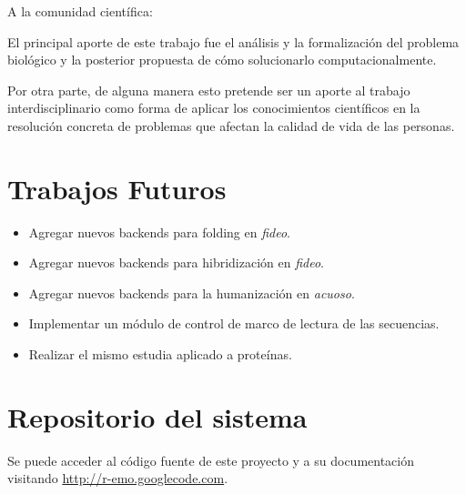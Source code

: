 \par A la comunidad científica:
\par El principal aporte de este trabajo fue el análisis y la formalización del
problema biológico y la posterior propuesta de cómo solucionarlo
computacionalmente. 

\par Por otra parte, de alguna manera esto pretende ser un aporte al trabajo interdisciplinario como forma de aplicar los conocimientos científicos en la resolución concreta de problemas que afectan la calidad de vida de las personas.

\section{Trabajos Futuros}
\begin{itemize}
	\item Agregar nuevos backends para folding en \emph{fideo}.
	\item Agregar nuevos backends para hibridización en \emph{fideo}.
	\item Agregar nuevos backends para la humanización en \emph{acuoso}.
	\item Implementar un módulo de control de marco de lectura de las secuencias.
	\item Realizar el mismo estudia aplicado a proteínas.
\end{itemize}

\section{Repositorio del sistema}
Se puede acceder al código fuente de este proyecto y a su documentación visitando \url{http://r-emo.googlecode.com}.


